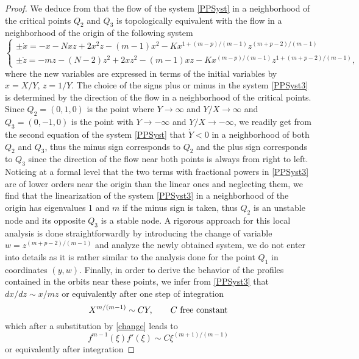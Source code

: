 \documentclass[a4paper,11pt]{article}
\numberwithin{equation}{section}
\begin{document}
\begin{proof}
We deduce from \cite[Theorem 2, Section 3.10]{Pe} that the flow of the system \eqref{PPSyst} in a neighborhood of the critical points $Q_2$ and $Q_3$ is topologically equivalent with the flow in a neighborhood of the origin of the following system
\begin{equation}\label{PPSyst3}
\left\{\begin{array}{ll}\pm\dot{x}=-x-Nxz+2x^2z-(m-1)x^2-Kx^{1+(m-p)/(m-1)}z^{(m+p-2)/(m-1)}\\ \pm\dot{z}=-mz-(N-2)z^2+2xz^2-(m-1)xz-Kx^{(m-p)/(m-1)}z^{1+(m+p-2)/(m-1)},\end{array}\right.
\end{equation}
where the new variables are expressed in terms of the initial variables by $x=X/Y$, $z=1/Y$. The choice of the signs plus or minus in the system \eqref{PPSyst3} is determined by the direction of the flow in a neighborhood of the critical points. Since $Q_2=(0,1,0)$ is the point where $Y\to\infty$ and $Y/X\to\infty$ and $Q_3=(0,-1,0)$ is the point with $Y\to-\infty$ and $Y/X\to-\infty$, we readily get from the second equation of the system \eqref{PPSyst} that $\dot{Y}<0$ in a neighborhood of both $Q_2$ and $Q_3$, thus the minus sign corresponds to $Q_2$ and the plus sign corresponds to $Q_3$ since the direction of the flow near both points is always from right to left. Noticing at a formal level that the two terms with fractional powers in \eqref{PPSyst3} are of lower orders near the origin than the linear ones and neglecting them, we find that the linearization of the system \eqref{PPSyst3} in a neighborhood of the origin has eigenvalues 1 and $m$ if the minus sign is taken, thus $Q_2$ is an unstable node and its opposite $Q_3$ is a stable node. A rigorous approach for this local analysis is done straightforwardly by introducing the change of variable $w=z^{(m+p-2)/(m-1)}$ and analyze the newly obtained system, we do not enter into details as it is rather similar to the analysis done for the point $Q_1$ in coordinates $(y,w)$. Finally, in order to derive the behavior of the profiles contained in the orbits near these points, we infer from \eqref{PPSyst3} that $dx/dz\sim x/mz$ or equivalently after one step of integration
\begin{equation}\label{interm5}
X^{m/(m-1)}\sim CY, \qquad C \ {\rm free \ constant}
\end{equation}
which after a substitution by \eqref{change} leads to
$$
f^{m-1}(\xi)f'(\xi)\sim C\xi^{(m+1)/(m-1)}
$$
or equivalently after integration

\end{proof}
\end{document}
